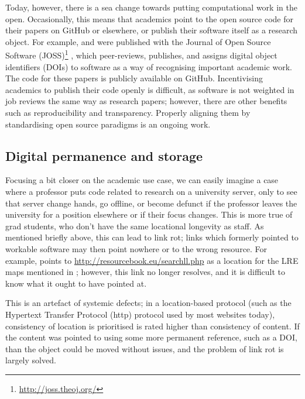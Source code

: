Today, however, there is a sea change towards putting computational work in the open. Occasionally, this means that academics point to the open source code for their papers on GitHub or elsewhere, or publish their software itself as a research object. For example, \citet{makela2016integrated} and \citet{kleinberg2017web} were published with the Journal of Open Source Software (JOSS)\footnote{\href{http://joss.theoj.org/}{http://joss.theoj.org/}} \citep{smith2018journal}, which peer-reviews, publishes, and assigns digital object identifiers (DOIs) to software as a way of recognising important academic work. The code for these papers is publicly available on GitHub. Incentivising academics to publish their code openly is difficult, as software is not weighted in job reviews the same way as research papers; however, there are other benefits such as reproducibility and transparency. Properly aligning them by standardising open source paradigms is an ongoing work.

\subsection{Digital permanence and storage}
\label{subsec:digital-permanence}

Focusing a bit closer on the academic use case, we can easily imagine a case where a professor puts code related to research on a university server, only to see that server change hands, go offline, or become defunct if the professor leaves the university for a position elsewhere or if their focus changes. This is more true of grad students, who don't have the same locational longevity as staff. As mentioned briefly above, this can lead to link rot; links which formerly pointed to workable software may then point nowhere or to the wrong resource. For example, \citet{bender2016linguistic} points to \href{http://resourcebook.eu/searchll.php}{http://resourcebook.eu/searchll.php} as a location for the LRE maps mentioned in \citet{calzolari2012lre}; however, this link no longer resolves, and it is difficult to know what it ought to have pointed at.

This is an artefact of systemic defects; in a location-based protocol (such as the Hypertext Transfer Protocol (http) protocol used by most websites today), consistency of location is prioritised is rated higher than consistency of content. If the content was pointed to using some more permanent reference, such as a DOI, than the object could be moved without issues, and the problem of link rot is largely solved.

